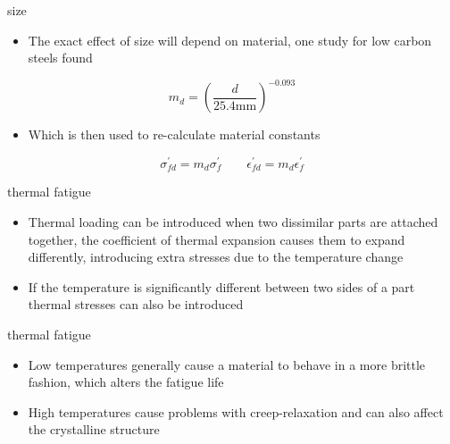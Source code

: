 \documentclass[
  letterpaper,
  ignorenonframetext,
  aspectratio=43,
  handout,
  12pt]{beamer}
\providecommand{\tightlist}{%
  \setlength{\itemsep}{0pt}\setlength{\parskip}{0pt}}
\providecommand{\tightlist}{%
\setlength{\itemsep}{0pt}\setlength{\parskip}{0pt}}
\begin{document}
\begin{frame}{size}
\protect\hypertarget{size-1}{}
\begin{itemize}
\tightlist
\item
  The exact effect of size will depend on material, one study for low
  carbon steels found
\end{itemize}

\[m_d = \left(\frac{d}{25.4 \text{mm}}\right)^{-0.093}\]

\begin{itemize}
\tightlist
\item
  Which is then used to re-calculate material constants
\end{itemize}

\[ \sigma_{fd}^\prime = m_d \sigma_f^\prime \qquad \epsilon_{fd}^\prime = m_d \epsilon_f^\prime \]
\end{frame}

\begin{frame}{thermal fatigue}
\protect\hypertarget{thermal-fatigue}{}
\begin{itemize}
\tightlist
\item
  Thermal loading can be introduced when two dissimilar parts are
  attached together, the coefficient of thermal expansion causes them to
  expand differently, introducing extra stresses due to the temperature
  change
\item
  If the temperature is significantly different between two sides of a
  part thermal stresses can also be introduced
\end{itemize}
\end{frame}

\begin{frame}{thermal fatigue}
\protect\hypertarget{thermal-fatigue-1}{}
\begin{itemize}
\tightlist
\item
  Low temperatures generally cause a material to behave in a more
  brittle fashion, which alters the fatigue life
\item
  High temperatures cause problems with creep-relaxation and can also
  affect the crystalline structure
\end{itemize}
\end{frame}
\end{document}
